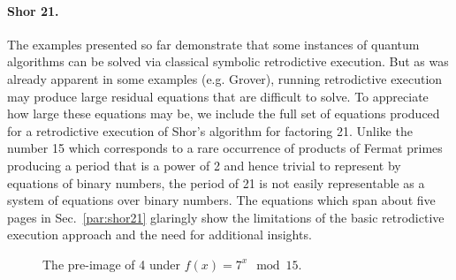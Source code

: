\documentclass{article}
\begin{document}
\begin{refsection}
\paragraph*{Shor 21.} 
The examples presented so far demonstrate that some instances of
quantum algorithms can be solved via classical symbolic retrodictive
execution. But as was already apparent in some examples (e.g. Grover),
running retrodictive execution may produce large residual equations
that are difficult to solve. To appreciate how large these equations
may be, we include the full set of equations produced for a
retrodictive execution of Shor's algorithm for factoring 21. Unlike
the number 15 which corresponds to a rare occurrence of products of
Fermat primes producing a period that is a power of 2 and hence
trivial to represent by equations of binary numbers, the period of 21
is not easily representable as a system of equations over binary
numbers. The equations which span about five pages in
Sec.~\ref{par:shor21} glaringly show the limitations of the basic
retrodictive execution approach and the need for additional insights.

\begin{wrapfigure}{r}{5cm}
\begin{center}
\end{center}
\caption{\label{fig:preimage}The pre-image of 4 under $f(x) = 7^x \mod 15$.}
\end{wrapfigure}

\end{refsection}
\end{document}
